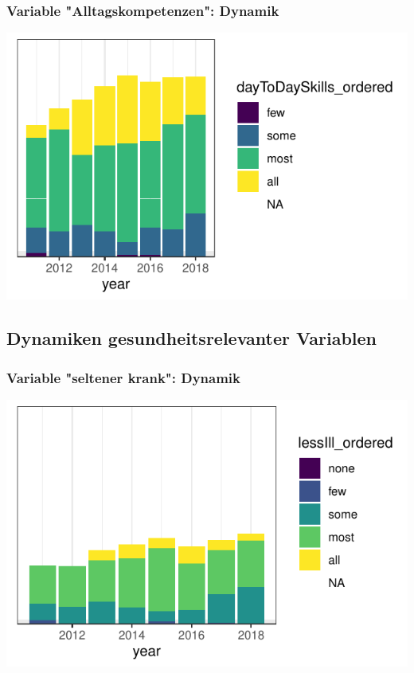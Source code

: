 \begin{frame}[fragile]
\frametitle{Variable "Alltagskompetenzen": Dynamik}
\begin{knitrout}\footnotesize
{}\color{fgcolor}

{\centering \includegraphics[width=\maxwidth]{figure/beamer-DayToDayTime-1} 

}



\end{knitrout}
\end{frame}

\subsection{Dynamiken gesundheitsrelevanter Variablen}

\begin{frame}[fragile]
\frametitle{Variable "seltener krank": Dynamik}
\begin{knitrout}\footnotesize
{}\color{fgcolor}

{\centering \includegraphics[width=\maxwidth]{figure/beamer-lessIllTime-1} 

}



\end{knitrout}
\end{frame} 

